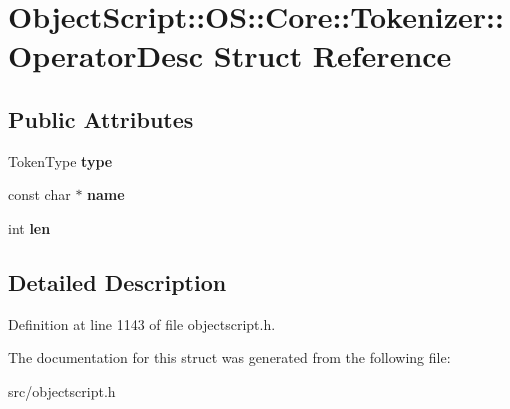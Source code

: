 \hypertarget{struct_object_script_1_1_o_s_1_1_core_1_1_tokenizer_1_1_operator_desc}{}\section{Object\+Script\+:\+:OS\+:\+:Core\+:\+:Tokenizer\+:\+:Operator\+Desc Struct Reference}
\label{struct_object_script_1_1_o_s_1_1_core_1_1_tokenizer_1_1_operator_desc}
\subsection*{Public Attributes}
\begin{DoxyCompactItemize}
\item 
Token\+Type {\bfseries type}\hypertarget{struct_object_script_1_1_o_s_1_1_core_1_1_tokenizer_1_1_operator_desc_a4c83c09dffb4f5bc1c83ab79b8c54aeb}{}\label{struct_object_script_1_1_o_s_1_1_core_1_1_tokenizer_1_1_operator_desc_a4c83c09dffb4f5bc1c83ab79b8c54aeb}

\item 
const char $\ast$ {\bfseries name}\hypertarget{struct_object_script_1_1_o_s_1_1_core_1_1_tokenizer_1_1_operator_desc_ab10d0bfab3cf8aff27965e0c50ef3e8b}{}\label{struct_object_script_1_1_o_s_1_1_core_1_1_tokenizer_1_1_operator_desc_ab10d0bfab3cf8aff27965e0c50ef3e8b}

\item 
int {\bfseries len}\hypertarget{struct_object_script_1_1_o_s_1_1_core_1_1_tokenizer_1_1_operator_desc_aa30bc7b17153b3b9adaf7edcb3c750a6}{}\label{struct_object_script_1_1_o_s_1_1_core_1_1_tokenizer_1_1_operator_desc_aa30bc7b17153b3b9adaf7edcb3c750a6}

\end{DoxyCompactItemize}


\subsection{Detailed Description}


Definition at line 1143 of file objectscript.\+h.



The documentation for this struct was generated from the following file\+:\begin{DoxyCompactItemize}
\item 
src/objectscript.\+h\end{DoxyCompactItemize}
